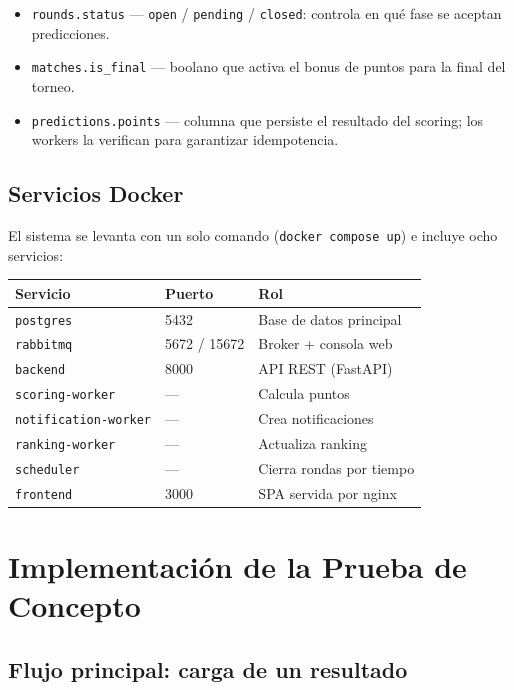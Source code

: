 \documentclass[12pt, a4paper]{article}
\begin{document}
\begin{itemize}[noitemsep]
  \item \texttt{rounds.status} — \texttt{open} / \texttt{pending} / \texttt{closed}: controla en qué fase se aceptan predicciones.
  \item \texttt{matches.is\_final} — boolano que activa el bonus de puntos para la final del torneo.
  \item \texttt{predictions.points} — columna que persiste el resultado del scoring; los workers la verifican para garantizar idempotencia.
\end{itemize}

\subsection{Servicios Docker}

El sistema se levanta con un solo comando (\texttt{docker compose up}) e incluye ocho servicios:

\begin{center}
\small
\begin{tabular}{lll}
\toprule
Servicio & Puerto & Rol \\
\midrule
\texttt{postgres} & 5432 & Base de datos principal \\
\texttt{rabbitmq} & 5672 / 15672 & Broker + consola web \\
\texttt{backend} & 8000 & API REST (FastAPI) \\
\texttt{scoring-worker} & — & Calcula puntos \\
\texttt{notification-worker} & — & Crea notificaciones \\
\texttt{ranking-worker} & — & Actualiza ranking \\
\texttt{scheduler} & — & Cierra rondas por tiempo \\
\texttt{frontend} & 3000 & SPA servida por nginx \\
\bottomrule
\end{tabular}
\end{center}

\section{Implementación de la Prueba de Concepto}

\subsection{Flujo principal: carga de un resultado}
\end{document}
